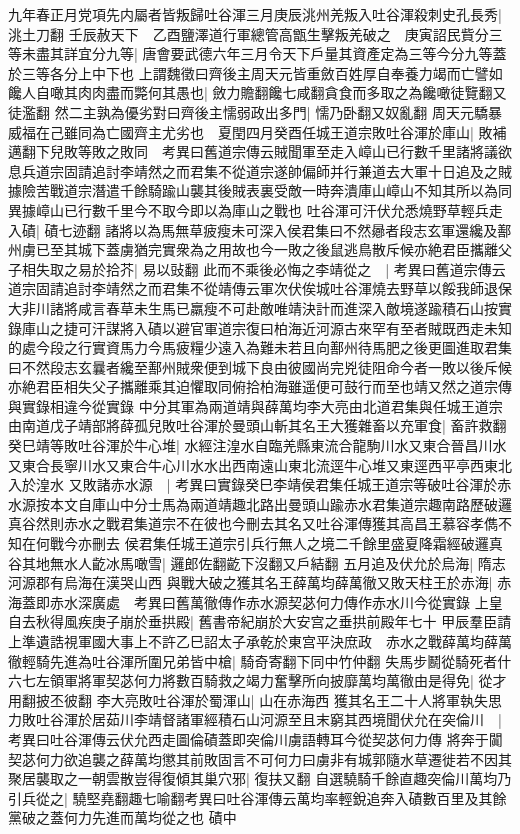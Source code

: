 九年春正月党項先内屬者皆叛歸吐谷渾三月庚辰洮州羌叛入吐谷渾殺刺史孔長秀|{
	洮土刀翻}
壬辰赦天下　乙酉鹽澤道行軍總管高甑生擊叛羌破之　庚寅詔民貲分三等未盡其詳宜分九等|{
	唐會要武德六年三月令天下戶量其資產定為三等今分九等蓋於三等各分上中下也}
上謂魏徵曰齊後主周天元皆重斂百姓厚自奉養力竭而亡譬如饞人自噉其肉肉盡而斃何其愚也|{
	斂力贍翻饞七咸翻貪食而多取之為饞噉徒覽翻又徒濫翻}
然二主孰為優劣對曰齊後主懦弱政出多門|{
	懦乃卧翻又奴亂翻}
周天元驕暴威福在己雖同為亡國齊主尤劣也　夏閏四月癸酉任城王道宗敗吐谷渾於庫山|{
	敗補邁翻下兒敗等敗之敗同　考異曰舊道宗傳云賊聞軍至走入嶂山已行數千里諸將議欲息兵道宗固請追討李靖然之而君集不從道宗遂帥偏師并行兼道去大軍十日追及之賊據險苦戰道宗潛遣千餘騎踰山襲其後賊表裏受敵一時奔潰庫山嶂山不知其所以為同異據嶂山已行數千里今不取今即以為庫山之戰也}
吐谷渾可汗伏允悉燒野草輕兵走入磧|{
	磧七迹翻}
諸將以為馬無草疲瘦未可深入侯君集曰不然曏者段志玄軍還纔及鄯州虜已至其城下蓋虜猶完實衆為之用故也今一敗之後鼠逃鳥散斥候亦絶君臣攜離父子相失取之易於拾芥|{
	易以䜴翻}
此而不乘後必悔之李靖從之　|{
	考異曰舊道宗傳云道宗固請追討李靖然之而君集不從靖傳云軍次伏俟城吐谷渾燒去野草以餒我師退保大非川諸將咸言春草未生馬已羸瘦不可赴敵唯靖決計而進深入敵境遂踰積石山按實錄庫山之捷可汗謀將入磧以避官軍道宗復曰柏海近河源古來罕有至者賊既西走未知的處今段之行實資馬力今馬疲糧少遠入為難未若且向鄯州待馬肥之後更圖進取君集曰不然段志玄曩者纔至鄯州賊衆便到城下良由彼國尚完兇徒阻命今者一敗以後斥候亦絶君臣相失父子攜離乘其迫懼取同俯拾柏海雖遥便可鼓行而至也靖又然之道宗傳與實錄相違今從實錄}
中分其軍為兩道靖與薛萬均李大亮由北道君集與任城王道宗由南道戊子靖部將薛孤兒敗吐谷渾於曼頭山斬其名王大獲雜畜以充軍食|{
	畜許救翻}
癸巳靖等敗吐谷渾於牛心堆|{
	水經注湟水自臨羌縣東流合龍駒川水又東合晉昌川水又東合長寧川水又東合牛心川水水出西南遠山東北流逕牛心堆又東逕西平亭西東北入於湟水}
又敗諸赤水源　|{
	考異曰實錄癸巳李靖侯君集任城王道宗等破吐谷渾於赤水源按本文自庫山中分士馬為兩道靖趣北路出曼頭山踰赤水君集道宗趣南路歷破邏真谷然則赤水之戰君集道宗不在彼也今刪去其名又吐谷渾傳獲其高昌王慕容孝儁不知在何戰今亦刪去}
侯君集任城王道宗引兵行無人之境二千餘里盛夏降霜經破邏真谷其地無水人齕冰馬噉雪|{
	邏郎佐翻齕下沒翻又戶結翻}
五月追及伏允於烏海|{
	隋志河源郡有烏海在漢哭山西}
與戰大破之獲其名王薛萬均薛萬徹又敗天柱王於赤海|{
	赤海蓋即赤水深廣處　考異曰舊萬徹傳作赤水源契苾何力傳作赤水川今從實錄}
上皇自去秋得風疾庚子崩於垂拱殿|{
	舊書帝紀崩於大安宫之垂拱前殿年七十}
甲辰羣臣請上準遺誥視軍國大事上不許乙巳詔太子承乾於東宫平決庶政　赤水之戰薛萬均薛萬徹輕騎先進為吐谷渾所圍兄弟皆中槍|{
	騎奇寄翻下同中竹仲翻}
失馬步鬭從騎死者什六七左領軍將軍契苾何力將數百騎救之竭力奮擊所向披靡萬均萬徹由是得免|{
	從才用翻披丕彼翻}
李大亮敗吐谷渾於蜀渾山|{
	山在赤海西}
獲其名王二十人將軍執失思力敗吐谷渾於居茹川李靖督諸軍經積石山河源至且末窮其西境聞伏允在突倫川　|{
	考異曰吐谷渾傳云伏允西走圖倫磧蓋即突倫川虜語轉耳今從契苾何力傳}
將奔于闐契苾何力欲追襲之薛萬均懲其前敗固言不可何力曰虜非有城郭隨水草遷徙若不因其聚居襲取之一朝雲散豈得復傾其巢穴邪|{
	復扶又翻}
自選驍騎千餘直趣突倫川萬均乃引兵從之|{
	驍堅堯翻趣七喻翻考異曰吐谷渾傳云萬均率輕銳追奔入磧數百里及其餘黨破之蓋何力先進而萬均從之也}
磧中


